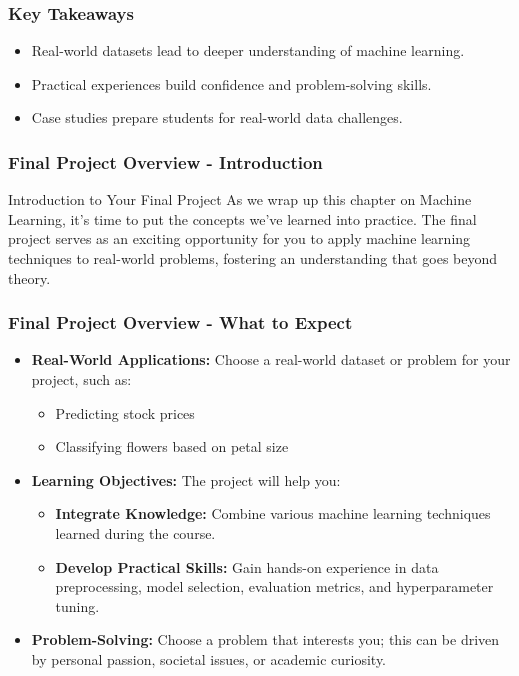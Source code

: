 \documentclass[aspectratio=169]{beamer}
\begin{document}
\begin{frame}[fragile]
    \frametitle{Key Takeaways}
    \begin{itemize}
        \item Real-world datasets lead to deeper understanding of machine learning.
        \item Practical experiences build confidence and problem-solving skills.
        \item Case studies prepare students for real-world data challenges.
    \end{itemize}
\end{frame}

\begin{frame}[fragile]
    \frametitle{Final Project Overview - Introduction}
    \begin{block}{Introduction to Your Final Project}
        As we wrap up this chapter on Machine Learning, it's time to put the concepts we've learned into practice. The final project serves as an exciting opportunity for you to apply machine learning techniques to real-world problems, fostering an understanding that goes beyond theory.
    \end{block}
\end{frame}

\begin{frame}[fragile]
    \frametitle{Final Project Overview - What to Expect}
    \begin{itemize}
        \item \textbf{Real-World Applications:} Choose a real-world dataset or problem for your project, such as:
        \begin{itemize}
            \item Predicting stock prices
            \item Classifying flowers based on petal size
        \end{itemize}

        \item \textbf{Learning Objectives:} The project will help you:
        \begin{itemize}
            \item \textbf{Integrate Knowledge:} Combine various machine learning techniques learned during the course.
            \item \textbf{Develop Practical Skills:} Gain hands-on experience in data preprocessing, model selection, evaluation metrics, and hyperparameter tuning.
        \end{itemize}

        \item \textbf{Problem-Solving:} Choose a problem that interests you; this can be driven by personal passion, societal issues, or academic curiosity.
    \end{itemize}
\end{frame}
\end{document}
